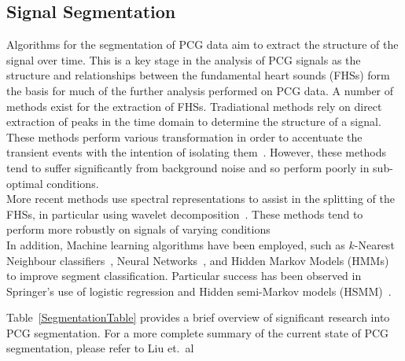 \documentclass[titlepage, 12pt]{scrartcl} \usepackage{enumitem}
\begin{document}
\subsection{Signal Segmentation}
Algorithms for the segmentation of PCG data aim to  extract the structure of
the signal over time. This is a key stage in the analysis of PCG signals as the
structure and relationships between the fundamental heart sounds (FHSs) form
the basis for much of the further analysis performed on PCG data. A number of
methods exist for the extraction of FHSs. Tradiational methods rely on direct
extraction of peaks in the time domain to determine the structure of a signal.
These methods perform various transformation in order to accentuate the
transient events with the intention of isolating them~\parencite{Liang1997b}.
However, these methods tend to suffer significantly from background noise and
so perform poorly in sub-optimal conditions.\\ More recent methods use spectral
representations to assist in the splitting of the FHSs, in particular using
wavelet decomposition~\parencite{Liang1997a, Vepa2008}. These methods tend to
perform more robustly on signals of varying conditions\\ In addition, Machine
learning algorithms have been employed, such as $k$-Nearest
Neighbour classifiers~\parencite{Gupta2007}, Neural
Networks~\parencite{Sepehri2010}, and Hidden Markov
Models (HMMs)~\parencite{Ricke2005} to improve segment classification.  Particular
success has been observed in Springer's use of logistic regression and Hidden
semi-Markov models (HSMM)~\citeyearpar{Springer2016}.


Table~\ref{SegmentationTable} provides a brief overview of significant research
into PCG segmentation. For a more complete summary of the current state of PCG
segmentation, please refer to Liu et.\ al~\citeyearpar{Liu2016}
\end{document}
